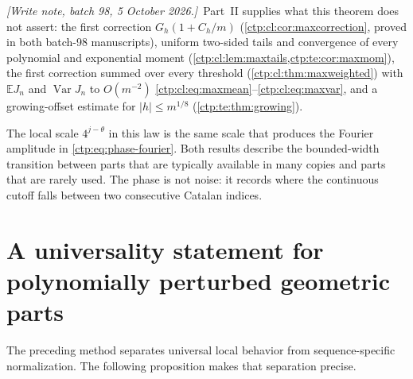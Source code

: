 \documentclass[11pt,a4paper]{article}
\numberwithin{equation}{section}
\theoremstyle{definition}
\theoremstyle{remark}
\DeclareMathOperator{\Var}{Var}
\newcommand{\writenoteB}[1]{\par\smallskip\noindent
 \textit{[Write note, batch 98, 5 October 2026.]}\ #1\par\smallskip}
\newcommand{\E}{\mathbb E}
\begin{document}
\writenoteB{Part~II supplies what this theorem does not assert: the first
correction $G_h(1+C_h/m)$ (\cref{ctp:cl:cor:maxcorrection}, proved in both
batch-98 manuscripts), uniform two-sided tails and convergence of every
polynomial and exponential moment (\cref{ctp:cl:lem:maxtails,ctp:te:cor:maxmom}),
the first correction summed over every threshold
(\cref{ctp:cl:thm:maxweighted}) with $\E J_n$ and $\Var J_n$ to $O(m^{-2})$
\eqref{ctp:cl:eq:maxmean}--\eqref{ctp:cl:eq:maxvar}, and a growing-offset
estimate for $|h|\le m^{1/8}$ (\cref{ctp:te:thm:growing}).}

The local scale $4^{j-\theta}$ in this law is the same scale that produces
the Fourier amplitude in \eqref{ctp:eq:phase-fourier}. Both results describe
the bounded-width transition between parts that are typically available
in many copies and parts that are rarely used. The phase is not noise:
it records where the continuous cutoff falls between two consecutive
Catalan indices.

\section{A universality statement for polynomially perturbed geometric parts}
\label{ctp:sec:universality}
The preceding method separates universal local behavior from sequence-specific
normalization. The following proposition makes that separation precise.
\end{document}
